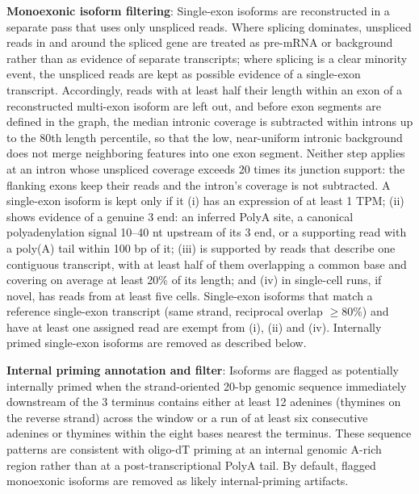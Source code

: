 \textbf{Monoexonic isoform filtering}: Single-exon isoforms are reconstructed in a separate pass that uses only unspliced reads. Where splicing dominates, unspliced reads in and around the spliced gene are treated as pre-mRNA or background rather than as evidence of separate transcripts; where splicing is a clear minority event, the unspliced reads are kept as possible evidence of a single-exon transcript. Accordingly, reads with at least half their length within an exon of a reconstructed multi-exon isoform are left out, and before exon segments are defined in the graph, the median intronic coverage is subtracted within introns up to the 80th length percentile, so that the low, near-uniform intronic background does not merge neighboring features into one exon segment. Neither step applies at an intron whose unspliced coverage exceeds 20 times its junction support: the flanking exons keep their reads and the intron's coverage is not subtracted. A single-exon isoform is kept only if it (i) has an expression of at least 1 TPM; (ii) shows evidence of a genuine 3\p{} end: an inferred PolyA site, a canonical polyadenylation signal 10--40 nt upstream of its 3\p{} end, or a supporting read with a poly(A) tail within 100 bp of it; (iii) is supported by reads that describe one contiguous transcript, with at least half of them overlapping a common base and covering on average at least 20\% of its length; and (iv) in single-cell runs, if novel, has reads from at least five cells. Single-exon isoforms that match a reference single-exon transcript (same strand, reciprocal overlap $\geq$80\%) and have at least one assigned read are exempt from (i), (ii) and (iv). Internally primed single-exon isoforms are removed as described below.

\textbf{Internal priming annotation and filter}: Isoforms are flagged as potentially internally primed when the strand-oriented 20-bp genomic sequence immediately downstream of the 3\p{} terminus contains either at least 12 adenines (thymines on the reverse strand) across the window or a run of at least six consecutive adenines or thymines within the eight bases nearest the terminus. These sequence patterns are consistent with oligo-dT priming at an internal genomic A-rich region rather than at a post-transcriptional PolyA tail. By default, flagged monoexonic isoforms are removed as likely internal-priming artifacts.

